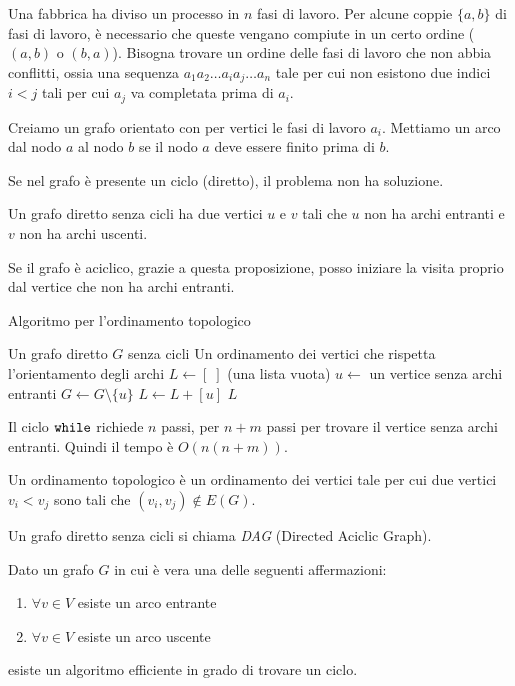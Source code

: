 \begin{exmp}
Una fabbrica ha diviso un processo in $n$ fasi di lavoro. Per alcune coppie $\{a,b\}$ di fasi di lavoro, \`e necessario che queste vengano compiute in un certo ordine ($(a,b)$ o $(b,a)$). Bisogna trovare un ordine delle fasi di lavoro che non abbia conflitti, ossia una sequenza $a_1 a_2 \dots a_i a_j \dots a_n$ tale per cui non esistono due indici $i < j$ tali per cui $a_j$ va completata prima di $a_i$.

Creiamo un grafo orientato con per vertici le fasi di lavoro $a_i$. Mettiamo un arco dal nodo $a$ al nodo $b$ se il nodo $a$ deve essere finito prima di $b$.

Se nel grafo \`e presente un ciclo (diretto), il problema non ha soluzione.

\begin{prop}
\label{grafo_diretto_aciclico}
Un grafo diretto senza cicli ha due vertici $u$ e $v$ tali che $u$ non ha archi entranti e $v$ non ha archi uscenti.
\end{prop}

Se il grafo \`e aciclico, grazie a questa proposizione, posso iniziare la visita proprio dal vertice che non ha archi entranti.

\begin{algorithm}
\caption{Algoritmo per l'ordinamento topologico}
\begin{algorithmic}[1]
\Require Un grafo diretto $G$ senza cicli
\Ensure Un ordinamento dei vertici che rispetta l'orientamento degli archi
\State $L \gets [\;]$ (una lista vuota)
    \State $u \gets$ un vertice senza archi entranti
    \State $G \gets G \setminus \{ u \}$
    \State $L \gets L + [u]$
\EndWhile
\State \Return $L$
\end{algorithmic}
\end{algorithm}

Il ciclo $\texttt{while}$ richiede $n$ passi, per $n+m$ passi per trovare il vertice senza archi entranti. Quindi il tempo \`e $O(n(n+m))$.

Un ordinamento topologico \`e un ordinamento dei vertici tale per cui due vertici $v_i < v_j$ sono tali che $(v_i, v_j) \notin E(G)$.
\end{exmp}

Un grafo diretto senza cicli si chiama \emph{DAG} (Directed Aciclic Graph).

\begin{prop}
Dato un grafo $G$ in cui \`e vera una delle seguenti affermazioni:
\begin{enumerate}
    \item $\forall v \in V$ esiste un arco entrante
    \item $\forall v \in V$ esiste un arco uscente
\end{enumerate}
esiste un algoritmo efficiente in grado di trovare un ciclo.
\end{prop}

